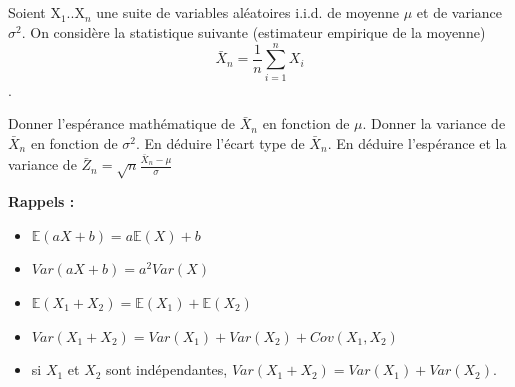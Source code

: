 \documentclass[12pt,paper=a4,answers]{exam}
\begin{document}
\subsection*{}
 Soient X$_1$..X$_n$ une suite de variables al\'eatoires i.i.d. de moyenne $\mu$ et de variance $\sigma^2$. On consid\`ere la statistique suivante (estimateur empirique de la moyenne) $$\bar{X}_n = \frac{1}{n} \sum_{i=1}^n X_i$$.
\setcounter{question}{1}
  \begin{questions}  
    \question Donner l'esp\'erance math\'ematique de $\bar{X}_n$ en fonction de $\mu$.
    \question Donner la variance de $\bar{X}_n$ en fonction de $\sigma^2$. En d\'eduire l'\'ecart type de $\bar{X}_n$. 
    \question En d\'eduire l'esp\'erance et la variance de $\bar{Z}_n=\sqrt{n} \frac{\bar{X}_n-\mu}{\sigma}$	 
   \end{questions}
  \vspace{2ex} 
 \textbf{Rappels :} 
  \begin{itemize}
	\item $\mathbb{E}(aX+b) = a\mathbb{E}(X)+b$ \vspace{0.1cm}
	\item $Var(aX+b)=a^2Var(X)$\vspace{0.1cm}
	\item $\mathbb{E}(X_1+X_2) = \mathbb{E}(X_1)+\mathbb{E}(X_2)$\vspace{0.1cm}
	\item$Var(X_1+X_2)=Var(X_1)+Var(X_2)+Cov(X_1,X_2)$\vspace{0.1cm}
	\item si $X_1$ et $X_2$ sont ind\'ependantes, $Var(X_1+X_2)=Var(X_1)+Var(X_2)$.
\end{itemize}  
\end{document}
